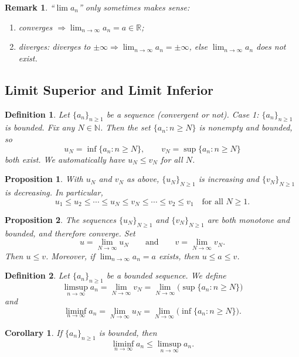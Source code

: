 \documentclass[12pt]{article}
\newtheorem*{remark}{Remark}
\newtheorem{proposition}{Proposition}
\newtheorem{corollary}{Corollary}
\newtheorem{definition}{Definition}
\begin{document}
\begin{remark}
``$\lim a_n$'' only sometimes makes sense:
\begin{enumerate}[label=\textbf{(\arabic*)}]
\item converges $\Rightarrow \lim_{n\to\infty} a_n=a\in\mathbb{R}$;
\item diverges: diverges to $\pm\infty \Rightarrow \lim_{n\to\infty} a_n=\pm\infty$,
else $\lim_{n\to\infty} a_n$ does not exist.
\end{enumerate}
\end{remark}

\subsection*{Limit Superior and Limit Inferior}
\begin{definition}
Let $\{a_n\}_{n\ge 1}$ be a sequence (convergent or not). Case 1:
$\{a_n\}_{n\ge 1}$ is bounded. Fix any $N\in\mathbb{N}$. Then the set
$\{a_n:n\ge N\}$ is nonempty and bounded, so
\[
u_N=\inf\{a_n:n\ge N\},\qquad v_N=\sup\{a_n:n\ge N\}
\]
both exist. We automatically have $u_N\le v_N$ for all $N$.
\end{definition}

\begin{proposition}
With $u_N$ and $v_N$ as above, $\{u_N\}_{N\ge 1}$ is increasing and
$\{v_N\}_{N\ge 1}$ is decreasing. In particular,
\[
u_1\le u_2\le \cdots \le u_N \le v_N \le \cdots \le v_2 \le v_1
\quad\text{for all }N\ge 1.
\]
\end{proposition}

\begin{proposition}
The sequences $\{u_N\}_{N\ge 1}$ and $\{v_N\}_{N\ge 1}$ are both monotone and
bounded, and therefore converge. Set
\[
u=\lim_{N\to\infty} u_N
\qquad\text{and}\qquad
v=\lim_{N\to\infty} v_N.
\]
Then $u\le v$. Moreover, if $\lim_{n\to\infty} a_n=a$ exists, then
$u\le a\le v$.
\end{proposition}

\begin{definition}
Let $\{a_n\}_{n\ge 1}$ be a bounded sequence. We define
\[
\limsup_{n\to\infty} a_n=\lim_{N\to\infty} v_N
=\lim_{N\to\infty}\Big(\sup\{a_n:n\ge N\}\Big)
\]
and
\[
\liminf_{n\to\infty} a_n=\lim_{N\to\infty} u_N
=\lim_{N\to\infty}\Big(\inf\{a_n:n\ge N\}\Big).
\]
\end{definition}

\begin{corollary}
If $\{a_n\}_{n\ge 1}$ is bounded, then
\[
\liminf_{n\to\infty} a_n \le \limsup_{n\to\infty} a_n.
\]
\end{corollary}
\end{document}
